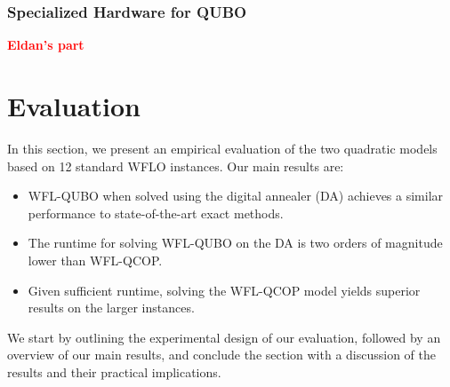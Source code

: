 \documentclass[preprint,12pt]{elsarticle}
\newcommand{\todo}[1]{{\textcolor{red}{\bf {#1}}}}
\begin{document}





\subsubsection{Specialized Hardware for QUBO}

\todo{Eldan's part}


\section{Evaluation}
\label{sec:eval}

In this section, we 
present an empirical evaluation of the two quadratic models based on 
12 standard WFLO instances.
Our main results are: \begin{itemize}
	\item WFL-QUBO when solved using the digital annealer (DA) achieves a similar performance to state-of-the-art exact methods.
		\item The runtime for solving WFL-QUBO on the DA is two orders of magnitude lower than WFL-QCOP.  
	\item Given sufficient runtime, solving the WFL-QCOP model yields superior results on the larger instances.
\end{itemize}
We start by outlining the experimental design of our evaluation, followed by an overview of our main results,
and conclude the section with a discussion of the results and their practical implications.
\end{document}
